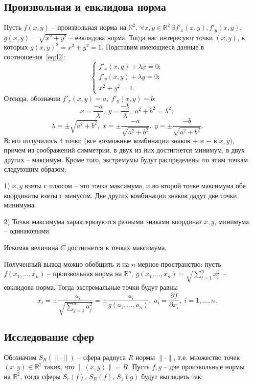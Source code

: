 \documentclass{article}
\begin{document}
\subsection{Произвольная и евклидова норма}
Пусть $f(x,y)$ -- произвольная норма на $\mathbb{R}^2$, $\forall{x,y \in \mathbb{R}^2} \,\exists{f'_x(x,y), f'_y(x,y)}$, \newline $g(x,y) = \sqrt{x^2+y^2} $ -- евклидова норма. Тогда нас интересуют точки $(x,y)$, в которых $g(x,y)^2 = x^2 + y^2 = 1$. Подставим имеющиеся данные в соотношения~\eqref{eq:l2}:
\begin{equation*}
	\begin{cases}
		f'_x(x,y) + \lambda x = 0; \\
		f'_y(x,y) + \lambda y = 0; \\
		x^2 + y^2 = 1.
	\end{cases}
\end{equation*}
Отсюда, обозначив $f'_x(x,y) = a, \; f'_y(x,y) = b$:
$$ x = \frac{-a}{\lambda}, \; y = \frac{-b}{\lambda}, \; a^2 + b^2 = \lambda^2; $$
$$ \lambda = \pm \sqrt{a^2+b^2}, \; x = \pm\frac{-a}{\sqrt{a^2+b^2}}, \; y = \pm\frac{-b}{\sqrt{a^2+b^2}}. $$
Всего получилось 4 точки (все возможные комбинации знаков $+$ и $-$ в $x,y$), причем из соображений симметрии, в двух из них достигнется минимум, в двух других -- максимум. Кроме того, экстремумы будут распределены по этим точкам следующим образом:
 
\vspace{1mm}
1) $x, y$ взяты с плюсом -- это точка максимума, и во второй точке максимума обе координаты взяты с минусом. Две других комбинации знаков дадут две точки минимума.

2) Точки максимума характеризуются разными знаками координат $x,y$, минимума -- одинаковыми.

\vspace{1mm}
Искомая величина $C$ достигнется в точках максимума.

Полученный вывод можно обобщить и на $n$-мерное пространство: пусть $f(x_1,\ldots,x_n)$ -- произвольная норма на $\mathbb{R}^n$, $g(x_1,\ldots,x_n) =  \sqrt{\sum\limits_{i=1}^n{x_i^2}}$ -- евклидова норма. Тогда экстремальные точки будут равны
$$ x_i = \pm \frac{-a_i}{\sqrt{\sum\limits_{j=1}^n{a_j^2}}} = \pm \frac{-a_i}{g(a_1,\ldots,a_n)}, \; a_i = \frac{\partial f}{\partial x_i}, \; i=1,\ldots,n. $$

\subsection{Исследование сфер} \label{3.3}
Обозначим $S_R(\|{\cdot}\|)$ -- сфера радиуса $R$ нормы $\|{\cdot}\|$, т.е. множество точек $(x,y) \in \mathbb{R}^2$ таких, что $\|(x,y)\| = R$. Пусть $f,g$ -- две произвольные нормы на $\mathbb{R}^2$, тогда сферы $S_r(f), \, S_R(f), \, S_1(g)$ будут выглядеть так:
\end{document}
